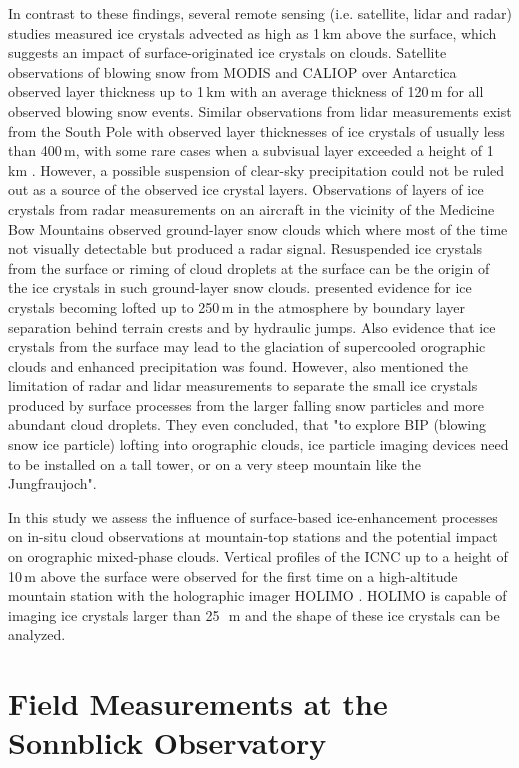 \documentclass[draft,linenumbers]{agujournal}
\begin{document}
In contrast to these findings, several remote sensing (i.e. satellite, lidar and radar) studies measured ice crystals advected as high as 1\,\si{km} above the surface, which suggests an impact of surface-originated ice crystals on clouds. Satellite observations of blowing snow from MODIS and CALIOP over Antarctica \citep{Pal11} observed layer thickness up to 1\,\si{km} with an average thickness of 120\,\si{m} for all observed blowing snow events. Similar observations from lidar measurements exist from the South Pole with observed layer thicknesses of ice crystals of usually less than 400\,\si{m}, with some rare cases when a subvisual layer exceeded a height of 1\,\si{km} \citep{Mah03}. However, a possible suspension of clear-sky precipitation could not be ruled out as a source of the observed ice crystal layers. Observations of layers of ice crystals from radar measurements on an aircraft in the vicinity of the Medicine Bow Mountains \citep{Val12} observed ground-layer snow clouds which where most of the time not visually detectable but produced a radar signal. Resuspended ice crystals from the surface or riming of cloud droplets at the surface can be the origin of the ice crystals in such ground-layer snow clouds. \citet{Gee15} presented evidence for ice crystals becoming lofted up to 250\,\si{m} in the atmosphere by boundary layer separation behind terrain crests and by hydraulic jumps. Also evidence that ice crystals from the surface may lead to the glaciation of supercooled orographic clouds and enhanced precipitation was found. However, \citet{Gee15} also mentioned the limitation of radar and lidar measurements to separate the small ice crystals produced by surface processes from the larger falling snow particles and more abundant cloud droplets. They even concluded, that "to explore BIP (blowing snow ice particle) lofting into orographic clouds, ice particle imaging devices need to be installed on a tall tower, or on a very steep mountain like the Jungfraujoch".

In this study we assess the influence of surface-based ice-enhancement processes on in-situ cloud observations at mountain-top stations and the potential impact on orographic mixed-phase clouds. Vertical profiles of the ICNC up to a height of 10\,\si{m} above the surface were observed for the first time on a high-altitude mountain station with the holographic imager HOLIMO \citep{Bec17}. HOLIMO is capable of imaging ice crystals larger than 25\,\si{\mu m} and the shape of these ice crystals can be analyzed.

\section{Field Measurements at the Sonnblick Observatory}
\label{sectionMeasurementSite}
\end{document}
